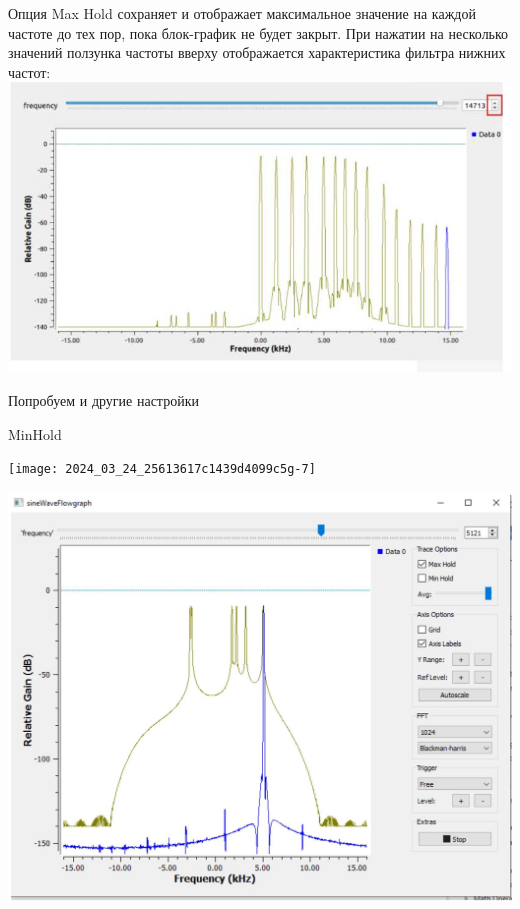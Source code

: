 \documentclass[10pt]{article}
\begin{document}
Опция Max Hold сохраняет и отображает максимальное значение на каждой частоте до тех пор, пока блок-график не будет закрыт. При нажатии на несколько значений ползунка частоты вверху отображается характеристика фильтра нижних частот:\\
\includegraphics[max width=\textwidth, center]{graf}

Попробуем и другие настройки

MinHold

\begin{center}
\texttt{[image: 2024\_03\_24\_25613617c1439d4099c5g-7]}
\end{center}

\begin{center}
\includegraphics[max width=\textwidth]{MaxHold}
\end{center}
\end{document}
